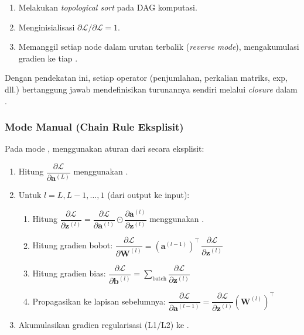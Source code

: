 \begin{enumerate}
    \item Melakukan \textit{topological sort} pada DAG komputasi.
    \item Menginisialisasi $\partial \mathcal{L}/\partial \mathcal{L} = 1$.
    \item Memanggil  setiap node dalam urutan terbalik
          (\textit{reverse mode}), mengakumulasi gradien ke 
          tiap .
\end{enumerate}

Dengan pendekatan ini, setiap operator (penjumlahan, perkalian matriks, exp,
dll.) bertanggung jawab mendefinisikan turunannya sendiri melalui \textit{closure}
dalam .

\subsubsection{Mode Manual (Chain Rule Eksplisit)}

Pada mode ,  menggunakan aturan dari
 secara eksplisit:

\begin{enumerate}
    \item Hitung $\dfrac{\partial \mathcal{L}}{\partial \mathbf{a}^{(L)}}$
          menggunakan .

    \item Untuk $l = L, L-1, \ldots, 1$ (dari output ke input):
    \begin{enumerate}
        \item Hitung $\dfrac{\partial \mathcal{L}}{\partial \mathbf{z}^{(l)}} =
              \dfrac{\partial \mathcal{L}}{\partial \mathbf{a}^{(l)}} \odot
              \dfrac{\partial \mathbf{a}^{(l)}}{\partial \mathbf{z}^{(l)}}$
              menggunakan .
        \item Hitung gradien bobot:
              $\dfrac{\partial \mathcal{L}}{\partial \mathbf{W}^{(l)}} =
              (\mathbf{a}^{(l-1)})^{\top}\,\dfrac{\partial \mathcal{L}}{\partial
              \mathbf{z}^{(l)}}$
        \item Hitung gradien bias:
              $\dfrac{\partial \mathcal{L}}{\partial \mathbf{b}^{(l)}} =
              \sum_{\text{batch}}\dfrac{\partial \mathcal{L}}{\partial
              \mathbf{z}^{(l)}}$
        \item Propagasikan ke lapisan sebelumnya:
              $\dfrac{\partial \mathcal{L}}{\partial \mathbf{a}^{(l-1)}} =
              \dfrac{\partial \mathcal{L}}{\partial \mathbf{z}^{(l)}}
              (\mathbf{W}^{(l)})^{\top}$
    \end{enumerate}
    \item Akumulasikan gradien regularisasi (L1/L2) ke .
\end{enumerate}

